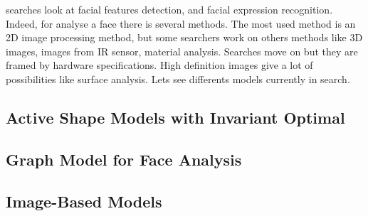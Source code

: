  searches look at facial features detection, and facial expression recognition. Indeed, for analyse a face there is several methods. The most used method is an 2D image processing method, but some searchers work on others methods like 3D images, images from IR sensor, material analysis. Searches move on but they are framed by hardware specifications. High definition images give a lot of possibilities like surface analysis. Lets see differents models currently in search.
\subsection{Active Shape Models with Invariant Optimal}
	
\subsection{Graph Model for Face Analysis}

\subsection{Image-Based Models}
